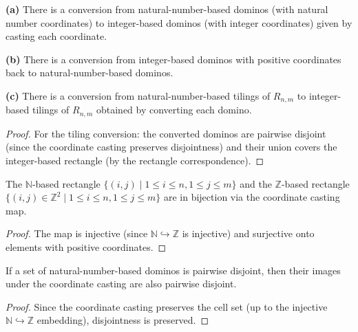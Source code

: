 \begin{definition}
\label{def.details.domino.bridge-conversions}
\leanhelper
\leanok
\textbf{(a)} There is a conversion from natural-number-based dominos
(with natural number coordinates) to integer-based dominos (with integer
coordinates) given by casting each coordinate. \medskip

\textbf{(b)} There is a conversion from integer-based dominos
with positive coordinates back to natural-number-based dominos. \medskip

\textbf{(c)} There is a conversion from natural-number-based tilings
of $R_{n,m}$ to integer-based tilings of $R_{n,m}$ obtained by converting
each domino.
\end{definition}

\begin{proof}
\leanok
For the tiling conversion: the converted dominos are pairwise disjoint
(since the coordinate casting preserves disjointness) and their union covers
the integer-based rectangle (by the rectangle correspondence).
\end{proof}

\begin{lemma}
\label{lem.details.domino.rectangle-correspondence}
\leanhelper
\leanok
The $\mathbb{N}$-based rectangle $\{(i,j) \mid 1 \le i \le n, 1 \le j \le m\}$ and
the $\mathbb{Z}$-based rectangle $\{(i,j) \in \mathbb{Z}^2 \mid 1 \le i \le n, 1 \le j \le m\}$
are in bijection via the coordinate casting map.
\end{lemma}

\begin{proof}
\leanok
The map is injective (since $\mathbb{N} \hookrightarrow \mathbb{Z}$ is injective)
and surjective onto elements with positive coordinates.
\end{proof}

\begin{lemma}
\label{lem.details.domino.toDominoZ-pairwise-disjoint}
\leanhelper
\leanok
If a set of natural-number-based dominos is pairwise disjoint, then their images under
the coordinate casting are also pairwise disjoint.
\end{lemma}

\begin{proof}
\leanok
Since the coordinate casting preserves the cell set (up to the injective
$\mathbb{N} \hookrightarrow \mathbb{Z}$ embedding), disjointness is preserved.
\end{proof}


